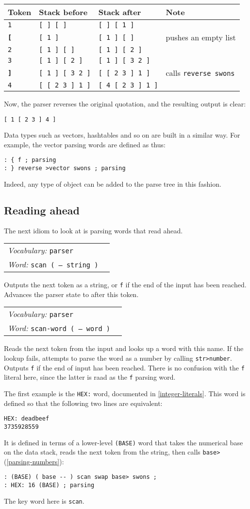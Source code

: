 \documentclass{book}
\newcommand{\vocabulary}[1]{\emph{Vocabulary:} \texttt{#1}&\\}
\newcommand{\ordinaryword}[2]{\index{\texttt{#1}}\emph{Word:} \texttt{#2}&\\}
\newcommand{\wordtable}[1]{


\begin{tabularx}{12cm}{lX}
\hline
#1
\hline
\end{tabularx}

}
\begin{document}
\begin{tabular}{l|l|l|l}
\hline
Token&Stack before&Stack after&Note\\
\hline
\verb|1|&\verb|[ ] [ ]|&\verb|[ ] [ 1 ]|&\\
\textbf{\texttt{[}}&\verb|[ 1 ]|&\verb|[ 1 ] [ ]|&pushes an empty list\\
\verb|2|&\verb|[ 1 ] [ ]|&\verb|[ 1 ] [ 2 ]|&\\
\verb|3|&\verb|[ 1 ] [ 2 ]|&\verb|[ 1 ] [ 3 2 ]|&\\
\textbf{\texttt{]}}&\verb|[ 1 ] [ 3 2 ]|&\verb|[ [ 2 3 ] 1 ]|&calls \verb|reverse swons|\\
\verb|4|&\verb|[ [ 2 3 ] 1 ]|&\verb|[ 4 [ 2 3 ] 1 ]|&
\end{tabular}

Now, the parser reverses the original quotation, and the resulting output is clear:
\begin{verbatim}
[ 1 [ 2 3 ] 4 ]
\end{verbatim}
Data types such as vectors, hashtables and so on are built in a similar way. For example, the vector parsing words are defined as thus:
\begin{verbatim}
: { f ; parsing
: } reverse >vector swons ; parsing
\end{verbatim}
Indeed, any type of object can be added to the parse tree in this fashion.

\subsection{Reading ahead}\label{reading-ahead}

The next idiom to look at is parsing words that read ahead.
\wordtable{
\vocabulary{parser}
\ordinaryword{scan}{scan ( -- string )}
}
Outputs the next token as a string, or \texttt{f} if the end of the input has been reached. Advances the parser state to after this token.
\wordtable{
\vocabulary{parser}
\ordinaryword{scan-word}{scan-word ( -- word )}
}
Reads the next token from the input and looks up a word with this name. If the lookup fails, attempts to parse the word as a number by calling \verb|str>number|. Outputs \verb|f| if the end of input has been reached. There is no confusion with the \verb|f| literal here, since the latter is raad as the \verb|f| parsing word.

The first example is the \verb|HEX:| word, documented in \ref{integer-literals}. This word is defined so that the following two lines are equivalent:
\begin{verbatim}
HEX: deadbeef
3735928559
\end{verbatim}
It is defined in terms of a lower-level \texttt{(BASE)} word that takes the numerical base on the data stack, reads the next token from the string, then calls \texttt{base>} (\ref{parsing-numbers}):
\begin{verbatim}
: (BASE) ( base -- ) scan swap base> swons ;
: HEX: 16 (BASE) ; parsing
\end{verbatim}
The key word here is \texttt{scan}.
\end{document}
